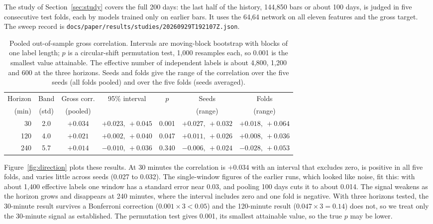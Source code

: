 \documentclass[11pt,a4paper]{article}
\begin{document}
The study of Section~\ref{sec:study} covers the full 200 days: the last half
of the history, 144,850 bars or about 100 days, is judged in five consecutive
test folds, each by models trained only on earlier bars. It uses the 64,64
network on all eleven features and the gross target. The sweep record is
\texttt{docs/paper/results/studies/20260929T192107Z.json}.

\begin{table}[h]
\centering
\small
\begin{tabular}{@{}rcccccc@{}}
\toprule
Horizon & Band & Gross corr. & 95\% interval & $p$ & Seeds & Folds \\
(min) & (std) & (pooled) & & & (range) & (range) \\
\midrule
30  & 2.0 & $+0.034$ & $+0.023,\ +0.045$ & 0.001 & $+0.027,\ +0.032$ & $+0.018,\ +0.064$ \\
120 & 4.0 & $+0.021$ & $+0.002,\ +0.040$ & 0.047 & $+0.011,\ +0.026$ & $+0.008,\ +0.036$ \\
240 & 5.7 & $+0.014$ & $-0.010,\ +0.036$ & 0.340 & $-0.006,\ +0.024$ & $-0.028,\ +0.053$ \\
\bottomrule
\end{tabular}
\caption{Pooled out-of-sample gross correlation. Intervals are moving-block
bootstrap with blocks of one label length; $p$ is a circular-shift permutation
test, 1,000 resamples each, so 0.001 is the smallest value attainable. The
effective number of independent labels is about 4,800, 1,200 and 600 at the
three horizons. Seeds and folds give the range of the correlation over the five
seeds (all folds pooled) and over the five folds (seeds averaged).}
\label{tab:study}
\end{table}

Figure~\ref{fig:direction} plots these results. At 30 minutes the correlation is $+0.034$ with an interval that excludes zero,
is positive in all five folds, and varies little across seeds (0.027 to 0.032).
The single-window figures of the earlier runs, which looked like noise, fit
this: with about 1,400 effective labels one window has a standard error near
0.03, and pooling 100 days cuts it to about 0.014. The signal weakens as the
horizon grows and disappears at 240 minutes, where the interval includes zero
and one fold is negative. With three horizons tested, the 30-minute result
survives a Bonferroni correction ($0.001\times 3<0.05$) and the 120-minute
result ($0.047\times 3=0.14$) does not, so we treat only the 30-minute signal
as established. The permutation test gives 0.001, its smallest attainable
value, so the true $p$ may be lower.
\end{document}
